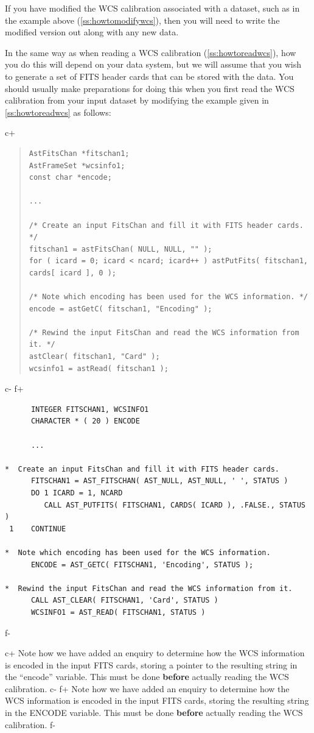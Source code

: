 \documentclass[twoside,11pt]{article}
\newcommand{\secref}[1]{\S\ref{#1}}
\renewcommand{\secref}[1]{\ref{#1}}
\begin{document}
If you have modified the WCS calibration associated with a dataset,
such as in the example above (\secref{ss:howtomodifywcs}), then you
will need to write the modified version out along with any new data.

In the same way as when reading a WCS calibration
(\secref{ss:howtoreadwcs}), how you do this will depend on your data
system, but we will assume that you wish to generate a set of FITS
header cards that can be stored with the data. You should usually make
preparations for doing this when you first read the WCS calibration
from your input dataset by modifying the example given in
\secref{ss:howtoreadwcs} as follows:

c+
\begin{quote}
\small
\begin{verbatim}
AstFitsChan *fitschan1;
AstFrameSet *wcsinfo1;
const char *encode;

...

/* Create an input FitsChan and fill it with FITS header cards. */
fitschan1 = astFitsChan( NULL, NULL, "" );
for ( icard = 0; icard < ncard; icard++ ) astPutFits( fitschan1, cards[ icard ], 0 );

/* Note which encoding has been used for the WCS information. */
encode = astGetC( fitschan1, "Encoding" );

/* Rewind the input FitsChan and read the WCS information from it. */
astClear( fitschan1, "Card" );
wcsinfo1 = astRead( fitschan1 );
\end{verbatim}
\normalsize
\end{quote}
c-
f+
\small
\begin{verbatim}
      INTEGER FITSCHAN1, WCSINFO1
      CHARACTER * ( 20 ) ENCODE

      ...

*  Create an input FitsChan and fill it with FITS header cards.
      FITSCHAN1 = AST_FITSCHAN( AST_NULL, AST_NULL, ' ', STATUS )
      DO 1 ICARD = 1, NCARD
         CALL AST_PUTFITS( FITSCHAN1, CARDS( ICARD ), .FALSE., STATUS )
 1    CONTINUE

*  Note which encoding has been used for the WCS information.
      ENCODE = AST_GETC( FITSCHAN1, 'Encoding', STATUS );

*  Rewind the input FitsChan and read the WCS information from it.
      CALL AST_CLEAR( FITSCHAN1, 'Card', STATUS )
      WCSINFO1 = AST_READ( FITSCHAN1, STATUS )
\end{verbatim}
\normalsize
f-

c+
Note how we have added an enquiry to determine how the WCS information
is encoded in the input FITS cards, storing a pointer to the resulting
string in the ``encode'' variable. This must be done {\bf{before}}
actually reading the WCS calibration.
c-
f+
Note how we have added an enquiry to determine how the WCS information
is encoded in the input FITS cards, storing the resulting string in
the ENCODE variable. This must be done {\bf{before}} actually reading
the WCS calibration.
f-
\end{document}
